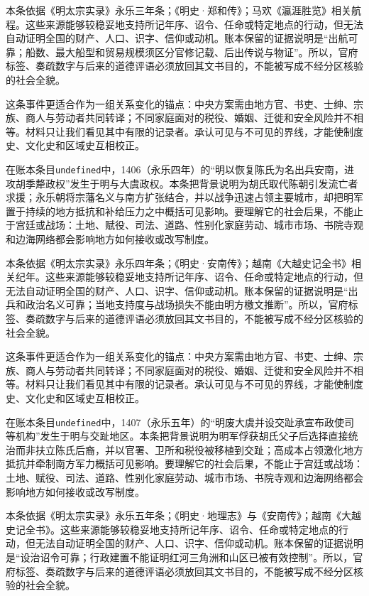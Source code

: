 本条依据《明太宗实录》永乐三年条；《明史·郑和传》；马欢《瀛涯胜览》相关航程。这些来源能够较稳妥地支持所记年序、诏令、任命或特定地点的行动，但无法自动证明全国的财产、人口、识字、信仰或动机。账本保留的证据说明是“出航可靠；船数、最大船型和贸易规模须区分官修记载、后出传说与物证”。所以，官府标签、奏疏数字与后来的道德评语必须放回其文书目的，不能被写成不经分区核验的社会全貌。

这条事件更适合作为一组关系变化的锚点：中央方案需由地方官、书吏、士绅、宗族、商人与劳动者共同转译；不同家庭面对的税役、婚姻、迁徙和安全风险并不相等。材料只让我们看见其中有限的记录者。承认可见与不可见的界线，才能使制度史、文化史和区域史互相校正。

在账本条目\texttt{undefined}中，1406（永乐四年）的“明以恢复陈氏为名出兵安南，进攻胡季犛政权”发生于明与大虞政权。本条把背景说明为胡氏取代陈朝引发流亡者求援；永乐朝将宗藩名义与南方扩张结合，并以战争迅速占领主要城市，却把明军置于持续的地方抵抗和补给压力之中概括可见影响。要理解它的社会后果，不能止于宫廷或战场：土地、赋役、司法、道路、性别化家庭劳动、城市市场、书院寺观和边海网络都会影响地方如何接收或改写制度。

本条依据《明太宗实录》永乐四年条；《明史·安南传》；越南《大越史记全书》相关纪年。这些来源能够较稳妥地支持所记年序、诏令、任命或特定地点的行动，但无法自动证明全国的财产、人口、识字、信仰或动机。账本保留的证据说明是“出兵和政治名义可靠；当地支持度与战场损失不能由明方檄文推断”。所以，官府标签、奏疏数字与后来的道德评语必须放回其文书目的，不能被写成不经分区核验的社会全貌。

这条事件更适合作为一组关系变化的锚点：中央方案需由地方官、书吏、士绅、宗族、商人与劳动者共同转译；不同家庭面对的税役、婚姻、迁徙和安全风险并不相等。材料只让我们看见其中有限的记录者。承认可见与不可见的界线，才能使制度史、文化史和区域史互相校正。

在账本条目\texttt{undefined}中，1407（永乐五年）的“明废大虞并设交趾承宣布政使司等机构”发生于明与交趾地区。本条把背景说明为明军俘获胡氏父子后选择直接统治而非扶立陈氏后裔，并以官署、卫所和税役被移植到交趾；高成本占领激化地方抵抗并牵制南方军力概括可见影响。要理解它的社会后果，不能止于宫廷或战场：土地、赋役、司法、道路、性别化家庭劳动、城市市场、书院寺观和边海网络都会影响地方如何接收或改写制度。

本条依据《明太宗实录》永乐五年条；《明史·地理志》与《安南传》；越南《大越史记全书》。这些来源能够较稳妥地支持所记年序、诏令、任命或特定地点的行动，但无法自动证明全国的财产、人口、识字、信仰或动机。账本保留的证据说明是“设治诏令可靠；行政建置不能证明红河三角洲和山区已被有效控制”。所以，官府标签、奏疏数字与后来的道德评语必须放回其文书目的，不能被写成不经分区核验的社会全貌。

